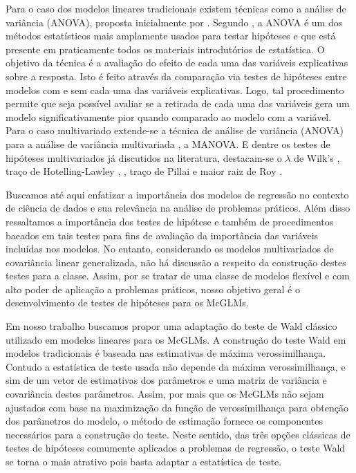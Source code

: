 Para o caso dos modelos lineares tradicionais existem técnicas como a análise de variância (ANOVA), proposta inicialmente por \citet{anova_fisher}. Segundo \citet{anova1}, a ANOVA é um dos métodos estatísticos mais amplamente usados para testar hipóteses e que está presente em praticamente todos os materiais introdutórios de estatística. O objetivo da técnica é a avaliação do efeito de cada uma das variáveis explicativas sobre a resposta. Isto é feito através da comparação via testes de hipóteses entre modelos com e sem cada uma das variáveis explicativas. Logo, tal procedimento permite que seja possível avaliar se a retirada de cada uma das variáveis gera um modelo significativamente pior quando comparado ao modelo com a variável. Para o caso multivariado extende-se a técnica de análise de variância (ANOVA) para a análise de variância  multivariada \citep{manova}, a MANOVA. E dentre os testes de hipóteses multivariados já discutidos na literatura, destacam-se o $\lambda$ de Wilk's \citep{wilks}, traço de Hotelling-Lawley \citep{lawley}, \citep{hotelling}, traço de Pillai \citep{pillai} e maior raiz de Roy \citep{roy}. 


Buscamos até aqui enfatizar a importância dos modelos de regressão no contexto de ciência de dados e sua relevância na análise de problemas práticos. Além disso ressaltamos a importância dos testes de hipótese e também de procedimentos baeados em tais testes para fins de avaliação da importância das variáveis incluídas nos modelos. No entanto, considerando os modelos multivariados de covariância linear generalizada, não há discussão a respeito da construção destes testes para a classe. Assim, por se tratar de uma classe de modelos flexível e com alto poder de aplicação a problemas práticos, nosso objetivo geral é o desenvolvimento de testes de hipóteses para os McGLMs.

Em nosso trabalho buscamos propor uma adaptação do teste de Wald clássico utilizado em modelos lineares para os McGLMs. A construção do teste Wald em modelos tradicionais é baseada nas estimativas de máxima verossimilhança. Contudo a estatística de teste usada não depende da máxima verossimilhança, e sim de um vetor de estimativas dos parâmetros e uma matriz de variância e covariância destes parâmetros. Assim, por mais que os McGLMs não sejam ajustados com base na maximização da função de verossimilhança para obtenção dos parâmetros do modelo, o método de estimação fornece os componentes necessários para a construção do teste. Neste sentido, das três opções clássicas de testes de hipóteses comumente aplicados a problemas de regressão, o teste Wald se torna o mais atrativo pois basta adaptar a estatística de teste.


